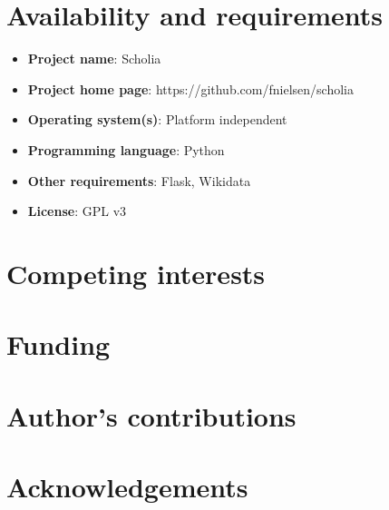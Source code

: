 \documentclass{bmcart}
\begin{document}
\begin{backmatter}

\section*{Availability and requirements}

\begin{itemize}
  \item \textbf{Project name}: Scholia
  \item \textbf{Project home page}: https://github.com/fnielsen/scholia
  \item \textbf{Operating system(s)}: Platform independent
  \item \textbf{Programming language}: Python
  \item \textbf{Other requirements}: Flask, Wikidata
  \item \textbf{License}: GPL v3
\end{itemize}

\section*{Competing interests}

\section*{Funding}

\section*{Author's contributions}

\section*{Acknowledgements}



%


\end{backmatter}
\end{document}
